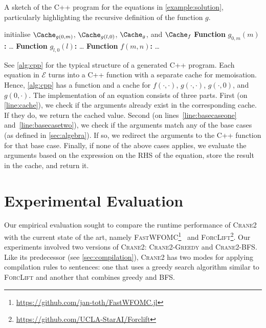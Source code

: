 \documentclass[a4paper,UKenglish,cleveref,autoref,table]{lipics-v2021}
\newcommand{\Cranetwo}{\textsc{Crane2}}
\newcommand{\Cranebfs}{\textsc{Crane2-BFS}}
\newcommand{\Cranegreedy}{\textsc{Crane2-Greedy}}
\begin{document}
\begin{algorithm}[t]
  \caption{A sketch of the C++ program for the equations in
    \cref{example:solution}, particularly highlighting the recursive definition
    of the function $g$.}\label{alg:cpp}
  initialise $\Cache_{g(0, m)}$, $\Cache_{g(l, 0)}$, $\Cache_{g}$, and
  $\Cache_{f}$\; \DontPrintSemicolon \textbf{Function} $g_{0,m}(m)$\textbf{:}
  \dots\; \textbf{Function} $g_{l,0}(l)$\textbf{:} \dots\; \PrintSemicolon
   \DontPrintSemicolon \textbf{Function} $f(m, n)$\textbf{:}
  \dots\; \PrintSemicolon {}
\end{algorithm}

See \cref{alg:cpp} for the typical structure of a generated C++ program. Each
equation in $\mathcal{E}$ turns into a C++ function with a separate cache for
memoisation. Hence, \cref{alg:cpp} has a function and a cache for
$f(\cdot, \cdot)$, $g(\cdot, \cdot)$, $g(\cdot, 0)$, and $g(0, \cdot)$. The
implementation of an equation consists of three parts. First (on
\autoref{line:cache}), we check if the arguments already exist in the
corresponding cache. If they do, we return the cached value. Second (on
lines~\ref{line:basecaseone} and~\ref{line:basecasetwo}), we check if the
arguments match any of the base cases (as defined in \cref{sec:algebra}). If so,
we redirect the arguments to the C++ function for that base case. Finally, if
none of the above cases applies, we evaluate the arguments based on the
expression on the RHS of the equation, store the result in the cache, and return
it.

\section{Experimental Evaluation}\label{sec:experiments}

Our empirical evaluation sought to compare the runtime performance of
{\Cranetwo} with the current state of the art, namely
\textsc{FastWFOMC}\footnote{\url{https://github.com/jan-toth/FastWFOMC.jl}}~\cite{DBLP:conf/kr/TothK24,DBLP:conf/uai/BremenK21}
and \textsc{ForcLift}\footnote{\url{https://github.com/UCLA-StarAI/Forclift}}.
Our experiments involved two versions of \Cranetwo{}: \Cranegreedy{} and
\Cranebfs{}. Like its predecessor (see \cref{sec:compilation}), \Cranetwo{} has
two modes for applying compilation rules to sentences: one that uses a greedy
search algorithm similar to \textsc{ForcLift} and another that combines greedy
and BFS\@.
\end{document}
